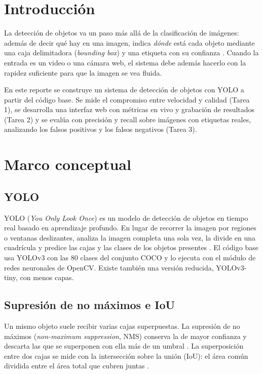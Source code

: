 \documentclass[11pt,letterpaper]{article}
\begin{document}
\portada
\indicegeneral

\section{Introducción}

La detección de objetos va un paso más allá de la clasificación de imágenes: además de decir qué hay en una imagen, indica \textit{dónde} está cada objeto mediante una caja delimitadora (\textit{bounding box}) y una etiqueta con su confianza \parencite{iae_u4_t42, elgendy2020}. Cuando la entrada es un video o una cámara web, el sistema debe además hacerlo con la rapidez suficiente para que la imagen se vea fluida.

En este reporte se construye un sistema de detección de objetos con YOLO a partir del código base. Se mide el compromiso entre velocidad y calidad (Tarea 1), se desarrolla una interfaz web con métricas en vivo y grabación de resultados (Tarea 2) y se evalúa con precisión y recall sobre imágenes con etiquetas reales, analizando los falsos positivos y los falsos negativos (Tarea 3).

\section{Marco conceptual}

\subsection{YOLO}

YOLO (\textit{You Only Look Once}) es un modelo de detección de objetos en tiempo real basado en aprendizaje profundo. En lugar de recorrer la imagen por regiones o ventanas deslizantes, analiza la imagen completa una sola vez, la divide en una cuadrícula y predice las cajas y las clases de los objetos presentes \parencite{iae_u4_t42}. El código base usa YOLOv3 con las 80 clases del conjunto COCO y lo ejecuta con el módulo de redes neuronales de OpenCV. Existe también una versión reducida, YOLOv3-tiny, con menos capas.

\subsection{Supresión de no máximos e IoU}

Un mismo objeto suele recibir varias cajas superpuestas. La supresión de no máximos (\textit{non-maximum suppression}, NMS) conserva la de mayor confianza y descarta las que se superponen con ella más de un umbral \parencite{iae_u4_t42}. La superposición entre dos cajas se mide con la intersección sobre la unión (IoU): el área común dividida entre el área total que cubren juntas \parencite{elgendy2020}.
\end{document}
